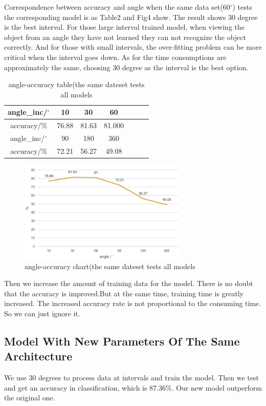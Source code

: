 \documentclass[11pt,journal,compsoc]{IEEEtran}
\begin{document}
  Correspondence between accuracy and angle when the same data set(60$^{\circ}$) tests the corresponding model is as Table2 and Fig4 show. The result shows 30 degree is the best interval. For those large interval trained model, when viewing the object from an angle they have not learned they can not recognize the object correctly. And for those with small intervals, the over-fitting problem can be more critical when the interval goes down. As for the time consumptions are approximately the same, choosing 30 degree as the interval is the best option.
  
  \begin{table}[ht]
    \caption{angle-accuracy table(the same dateset tests all models} %
    \centering %
      \begin{tabular}{|c|c|c|c|c|c|c|}
      \hline 
      angle\_inc/$^{\circ}$&10&30&60\\
      \hline  
      accuracy/\%&76.88&81.63&81.000\\
      \hline 
      angle\_inc/$^{\circ}$&90&180&360\\
      \hline  
      accuracy/\%&72.21&56.27&49.08\\
      \hline 
      \end{tabular}
  \end{table}

  \begin{figure}[ht]
    \centering
    \includegraphics[width=8cm]{pic/result2.png}
    \caption{angle-accuracy chart(the same dateset tests all models}
    \label{figure:label}
  \end{figure}

  Then we increase the amount of training data for the model. There is no doubt that the accuracy is improved.But at the same time, training time is greatly increased. The increased accuracy rate is not proportional to the consuming time. So we can just ignore it.

  \subsection{Model With New Parameters Of The Same Architecture}
  We use 30 degrees to process data at intervals and train the model. Then we test and get an accuracy in classification, which is 87.36\%. Our new model outperform the original one.
\end{document}
